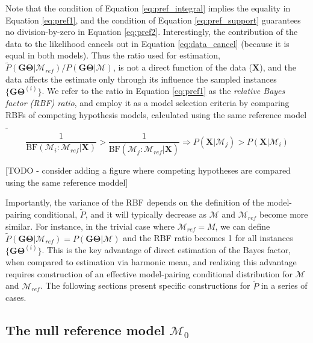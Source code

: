 \documentclass[11pt]{article}
\newcommand{\vect}[1]{\boldsymbol{\mathbf{#1}}}
\newcommand{\X}{\vect{X}}
\newcommand{\M}{\mathcal{M}}
\newcommand{\G}{\vect{G}}
\newcommand{\T}{\vect{\Theta}}
\newcommand{\GT}{\G\T}
\newcommand{\Mref}{\M_{ref}}
\newcommand{\Pref}{\widetilde{P}}
\newcommand{\rbf}{\text{BF}}
\newcommand{\1}{\mathbbm{1}}
\begin{document}
Note that the condition of Equation \ref{eq:pref_integral} implies the equality in Equation \ref{eq:pref1},
and the condition of Equation \ref{eq:pref_support} guarantees no division-by-zero in Equation \ref{eq:pref2}.
%
Interestingly, the contribution of the data to the likelihood cancels out in Equation \ref{eq:data_cancel} (because it is equal in both models).
%
Thus the ratio used for estimation, ${\Pref(\GT|\Mref) }/{P(\GT|\M)}$, is not a direct function of the data ($\X$),
and the data affects the estimate only through its influence the sampled instances $\{\GT^{(i)}\}$.
%
We refer to the ratio in Equation \ref{eq:pref1} as the {\em relative Bayes factor (RBF) ratio}, and employ it as a model selection criteria by comparing RBFs of competing hypothesis models, calculated using the same reference model - 
\[ \frac{1}{\rbf(\M_i:\Mref|\X)} >  \frac{1}{\rbf(\M_j:\Mref|\X)} \Rightarrow P(\X|\M_j) >  P(\X|\M_i)\]

[TODO - consider adding a figure where competing hypotheses are compared using the same reference moddel]

Importantly, the variance of the RBF depends on the definition of the model-pairing conditional, $\Pref$, and it will typically decrease as $\M$ and $\Mref$ become more similar.
%
For instance, in the trivial case where $\Mref=M$, we can define $\Pref(\GT|\Mref)=P(\GT|\M)$ and the RBF ratio becomes 1 for all instances $\{\GT^{(i)}\}$.
%
This is the key advantage of direct estimation of the Bayes factor, when compared to estimation via harmonic mean, and realizing this advantage requires construction of an effective model-pairing conditional distribution for $\M$ and $\Mref$.
%
The following sections present specific constructions for $\Pref$ in a series of cases.

\subsection{The null reference model $\M_0$}
\end{document}
